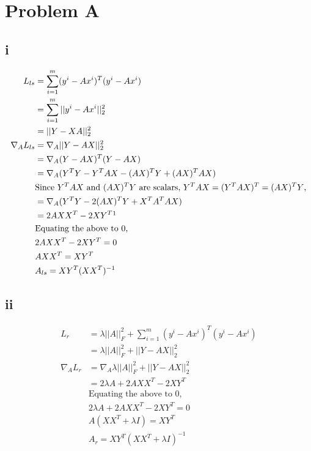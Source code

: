 \documentclass[twoside]{Homework}
\begin{document}
\maketitle

\section*{Problem A}
\subsection*{i}
\begin{align*}
L_{ls} 
&= \sum^{m}_{i=1} (y^i - Ax^i)^T (y^i - Ax^i)\\
&= \sum^{m}_{i=1} ||y^i - Ax^i||_2^2\\
&= ||Y-XA||_2^2\\ %
\nabla_A L_{ls} 
&= \nabla_A ||Y-AX||_2^2\\
&= \nabla_A (Y - AX)^T (Y - AX)\\
&= \nabla_A (Y^{T}Y - Y^{T}AX - (AX)^{T}Y + (AX)^{T} AX)\\
&\textrm{Since $Y^{T}AX$ and $(AX)^{T}Y$ are scalars, $Y^{T}AX = (Y^{T}AX )^{T} = (AX)^{T}Y$,}\\
&= \nabla_A (Y^{T}Y - 2(AX)^{T}Y + X^T A^T AX)\\
&= 2 A X X^{T} - 2 XY^{T}\footnotemark\\
&\textrm{Equating the above to 0,}\\
&2 A X X^{T} - 2 XY^{T} = 0\\
&A X X^{T} = XY^{T}\\
&A_{ls} = XY^{T} (X X^{T})^{-1} 
\end{align*}

\subsection*{ii}
\begin{align*}
L_{r} 
&= \lambda||A||^2_F + \sum^{m}_{i=1} (y^i - Ax^i)^T (y^i - Ax^i)\\
&= \lambda||A||^2_F + ||Y-AX||_2^2\\ %
\nabla_A L_{r} 
&= \nabla_A \lambda||A||^2_F + ||Y-AX||_2^2\\
&=  2\lambda A + 2 A X X^{T} - 2 XY^{T}\\
&\textrm{Equating the above to 0,}\\
&2\lambda A + 2 A X X^{T} - 2 XY^{T} = 0\\
&A(X X^{T} + \lambda I) = XY^{T}\\
&A_{r} = XY^{T} (X X^{T} + \lambda I)^{-1} 
\end{align*}
\end{document}
